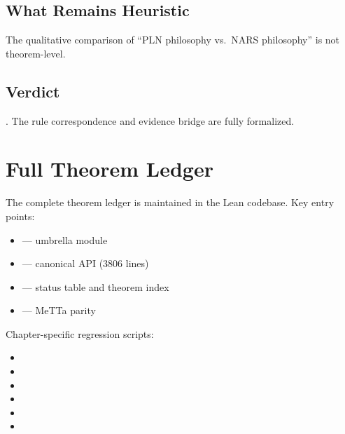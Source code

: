 \documentclass[11pt,openany]{report}
\begin{document}
\section{What Remains Heuristic}

The qualitative comparison of ``PLN philosophy vs.\ NARS philosophy''
is not theorem-level.

\section{Verdict}

\verdictClean{}.  The rule correspondence and evidence bridge are
fully formalized.


\appendix

\chapter{Full Theorem Ledger}
\label{app:ledger}

The complete theorem ledger is maintained in the Lean codebase.
Key entry points:

\begin{itemize}
\item {} --- umbrella module
\item {} --- canonical API (3806 lines)
\item {} --- status table and theorem index
\item {} --- MeTTa parity
\end{itemize}

Chapter-specific regression scripts:
\begin{itemize}
\item {}
\item {}
\item {}
\item {}
\item {}
\item {}
\end{itemize}
\end{document}
